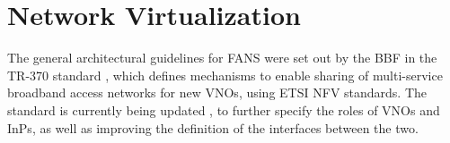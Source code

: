         




\section{Network Virtualization}
\label{Back:Sec:Virtualazation}

The general architectural guidelines for \ac{FANS} were set out by the \ac{BBF} in the TR-370 standard \cite{bbf370}, which defines mechanisms to enable sharing of multi-service broadband access networks for new \acp{VNO}, using \ac{ETSI} \ac{NFV} standards. The standard is currently being updated \cite{bbf370i2}, to further specify the roles of \acp{VNO} and \acp{InP}, as well as improving the definition of the interfaces between the two.

